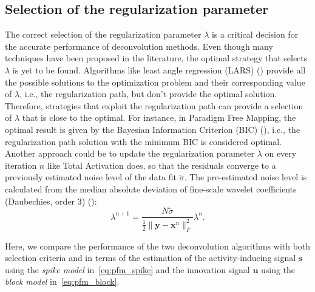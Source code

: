 \subsection{Selection of the regularization parameter}
\label{sec:regparam}

The correct selection of the regularization parameter \(\lambda\) is a critical decision for the accurate performance of deconvolution methods. Even though many techniques have been proposed in the literature, the optimal strategy that selects \(\lambda\) is yet to be found. Algorithms like least angle regression (LARS) (\citealt{efron2004LeastAngleRegression}) provide all the possible solutions to the optimization problem and their corresponding value of \(\lambda\), i.e., the regularization path, but don't provide the optimal solution. Therefore, strategies that exploit the regularization path can provide a selection of \(\lambda\) that is close to the optimal. For instance, in Paradigm Free Mapping, the optimal result is given by the Bayesian Information Criterion (BIC) (\citealt{schwarz1978EstimatingDimensionModel}), i.e., the regularization path solution with the minimum BIC is considered optimal. Another approach could be to update the regularization parameter \(\lambda\) on every iteration \(n\) like Total Activation does, so that the residuals converge to a previously estimated noise level of the data fit \(\tilde{\sigma}\). The pre-estimated noise level is calculated from the median absolute deviation of fine-scale wavelet coefficients (Daubechies, order 3) (\citealt{karahanoglu2013TotalActivationFMRI}):
\begin{equation}
    \lambda^{n+1} = \frac{N \tilde{\sigma}}{\frac{1}{2} \| \mathbf{y} - \mathbf{x}^n \|_F^2} \lambda^n.
\label{eq:std}
\end{equation}

Here, we compare the performance of the two deconvolution algorithms with both selection criteria and in terms of the estimation of the activity-inducing signal \(\mathbf{s}\) using the \textit{spike model} in~\eqref{eq:pfm_spike} and the innovation signal \(\mathbf{u}\) using the \textit{block model} in~\eqref{eq:pfm_block}.